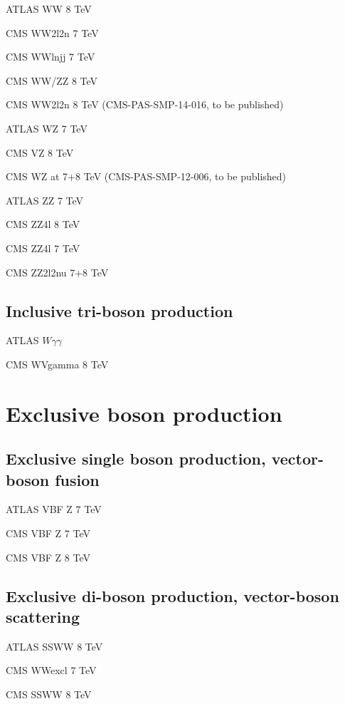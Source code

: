\documentclass[12pt]{iopart}
\begin{document}
ATLAS WW 8 TeV~\cite{ATLAS-CONF-2014-033}

CMS WW2l2n 7 TeV~\cite{Chatrchyan:2013yaa}

CMS WWlnjj 7 TeV~\cite{Chatrchyan:2012bd}

CMS WW/ZZ 8 TeV~\cite{Chatrchyan:2013oev}

CMS WW2l2n 8 TeV (CMS-PAS-SMP-14-016, to be published)


ATLAS WZ 7 TeV~\cite{Aad:2012twa}

CMS VZ 8 TeV~\cite{Chatrchyan:2014aqa}

CMS WZ at 7+8 TeV (CMS-PAS-SMP-12-006, to be published)


ATLAS ZZ 7 TeV~\cite{Aad:2012awa}

CMS ZZ4l 8 TeV~\cite{Khachatryan:2014dia}

CMS ZZ4l 7 TeV~\cite{Chatrchyan:2012sga}

CMS ZZ2l2nu 7+8 TeV~\cite{Khachatryan:2015pba}

\subsection{Inclusive tri-boson production}

ATLAS $W\gamma\gamma$~\cite{Aad:2015uqa}

CMS WVgamma 8 TeV~\cite{Chatrchyan:2014bza}

\section{Exclusive boson production}
\subsection{Exclusive single boson production, vector-boson fusion}

ATLAS VBF Z 7 TeV~\cite{Aad:2014dta}

CMS VBF Z 7 TeV~\cite{Chatrchyan:2013jya}

CMS VBF Z 8 TeV~\cite{Khachatryan:2014dea}

\subsection{Exclusive di-boson production, vector-boson scattering}

ATLAS SSWW 8 TeV~\cite{Aad:2014zda}

CMS WWexcl 7 TeV~\cite{Chatrchyan:2013foa}

CMS SSWW 8 TeV~\cite{Khachatryan:2014sta}
\end{document}
